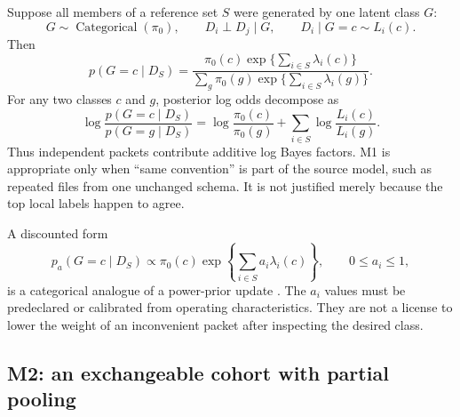 \documentclass[11pt]{article}
\begin{document}
    Suppose all members of a reference set $S$ were generated by one latent class $G$:
    \begin{equation}
        G\sim\operatorname{Categorical}(\pi_0),
        \qquad D_i\perp D_j\mid G,
        \qquad D_i\mid G=c\sim L_i(c).
        \label{eq:cohort-m1-model}
    \end{equation}
    Then
    \begin{equation}
        p(G=c\mid D_S)
        =\frac{\pi_0(c)\exp\{\sum_{i\in S}\lambda_i(c)\}}
        {\sum_g\pi_0(g)\exp\{\sum_{i\in S}\lambda_i(g)\}}.
        \label{eq:cohort-m1-posterior}
    \end{equation}
    For any two classes $c$ and $g$, posterior log odds decompose as
    \begin{equation}
        \log\frac{p(G=c\mid D_S)}{p(G=g\mid D_S)}
        =\log\frac{\pi_0(c)}{\pi_0(g)}
        +\sum_{i\in S}\log\frac{L_i(c)}{L_i(g)}.
        \label{eq:cohort-m1-log-odds}
    \end{equation}
    Thus independent packets contribute additive log Bayes factors. M1 is appropriate only
    when ``same convention'' is part of the source model, such as repeated files from one
    unchanged schema. It is not justified merely because the top local labels happen to
    agree.

    A discounted form
    \begin{equation}
        p_a(G=c\mid D_S)
        \propto\pi_0(c)\exp\left\{\sum_{i\in S}a_i\lambda_i(c)\right\},
        \qquad 0\le a_i\le1,
        \label{eq:cohort-power-posterior}
    \end{equation}
    is a categorical analogue of a power-prior update \cite{ibrahim2000}. The $a_i$ values
    must be predeclared or calibrated from operating characteristics. They are not a license
    to lower the weight of an inconvenient packet after inspecting the desired class.

    \subsection{M2: an exchangeable cohort with partial pooling}
\end{document}

